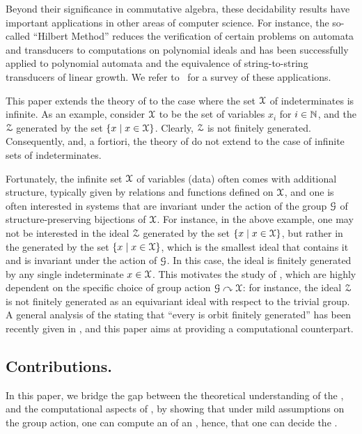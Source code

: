 \AP
Beyond their significance in commutative algebra,
these decidability results have important applications in
other areas of computer science. For instance, the so-called
``Hilbert Method'' reduces the verification of certain problems on automata and
transducers to computations on polynomial ideals and has been successfully applied
to polynomial automata and the equivalence of string-to-string transducers
of linear growth. We refer to~\cite{BOJAN19} for a survey of these applications.

\AP
This paper extends the theory of  to the case where
the set $\mathcal{X}$ of indeterminates is infinite.
As an example, consider $\mathcal{X}$ to be the
set of variables $x_i$ for $i \in \mathbb{N}$, and
the  $\mathcal{Z}$ generated by the set $\{ x \mid x \in \mathcal{X} \}$.
Clearly, $\mathcal{Z}$ is not finitely generated. Consequently,
 and, a fortiori, the theory of
do not extend to the case of infinite sets of indeterminates.

\AP
Fortunately, the infinite set $\mathcal{X}$ of
variables (data) often comes with additional structure,
typically given by relations and functions defined on $\mathcal{X}$,
and one is often interested in systems that are invariant
under the action of the group $\mathcal{G}$ of structure-preserving
bijections of $\mathcal{X}$.
For instance, in the above example,
one may not be interested in the ideal $\mathcal{Z}$ generated by the set
$\{ x \mid x \in \mathcal{X} \}$,
but rather in the  generated by
the set $\{ x \mid x \in \mathcal{X} \}$,
which is the smallest ideal that contains it and is invariant
under the action of $\mathcal{G}$.
In this case, the ideal is finitely generated by any single
indeterminate $x \in \mathcal{X}$.
This motivates the study of ,
which are highly dependent on the specific choice of group action
$\mathcal{G} \curvearrowright \mathcal{X}$:
for instance, the ideal $\mathcal{Z}$ is not finitely generated as an equivariant
ideal with respect to the trivial group. 
A general analysis of the 
stating that
``every  is orbit finitely generated''
has been recently given in \cite{GHOLAS24},
and this paper aims at providing a computational counterpart.




\subsection{Contributions.} \AP In this paper, we bridge the gap between the
theoretical understanding of the 
\cite[Property 4]{GHOLAS24}, and the computational aspects of , by showing that under mild assumptions on the group action, one can
compute an  of an , hence,
that one can decide the . 

